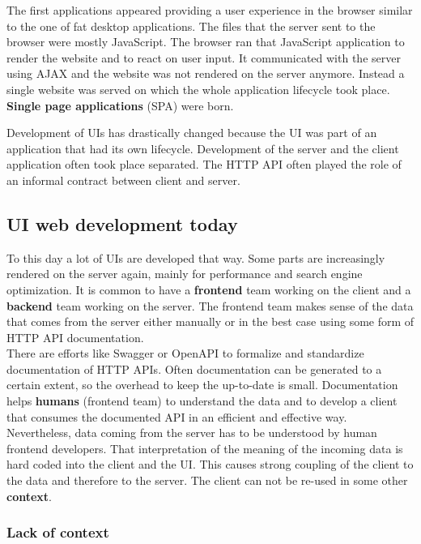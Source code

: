 The first applications appeared providing a user experience in the browser similar to the one of fat desktop applications. The files that the server sent to the browser were mostly JavaScript. The browser ran that JavaScript application to render the website and to react on user input. It communicated with the server using AJAX and the website was not rendered on the server anymore. Instead a single website was served on which the whole application lifecycle took place. \textbf{Single page applications} (SPA) were born.
\par Development of UIs has drastically changed because the UI was part of an application that had its own lifecycle. Development of the server and the client application often took place separated. The HTTP API often played the role of an informal contract between client and server.

\subsection{UI web development today}\label{uidevelopmenttoday}

To this day a lot of UIs are developed that way. Some parts are increasingly rendered on the server again, mainly for performance and search engine optimization. It is common to have a \textbf{frontend} team working on the client and a \textbf{backend} team working on the server. The frontend team makes sense of the data that comes from the server either manually or in the best case using some form of HTTP API documentation.
\\ There are efforts like Swagger or OpenAPI to formalize and standardize documentation of HTTP APIs. Often documentation can be generated to a certain extent, so the overhead to keep the up-to-date is small. Documentation helps \textbf{humans} (frontend team) to understand the data and to develop a client that consumes the documented API in an efficient and effective way.
\\ Nevertheless, data coming from the server has to be understood by human frontend developers. That interpretation of the meaning of the incoming data is hard coded into the client and the UI. This causes strong coupling of the client to the data and therefore to the server. The client can not be re-used in some other \textbf{context}.

\subsubsection{Lack of context}\label{datahumanmachine}


